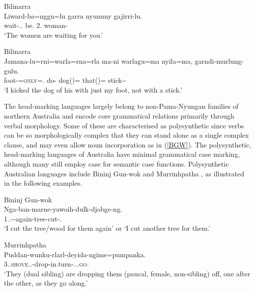 \documentclass[output=paper,hidelinks]{langscibook}
\begin{document}
%
\ea Bilinarra\\
\gll Liward-ba=nggu=lu garra nyununy gajirri-lu.\\
{wait-\MIN.\AUG.\SBJ} 	{be.\PRS} {2\MIN.\DAT} {woman-\ERG}\\
\glt `The women are waiting for you.’ \citep[121]{MeakNord14}
\z

\ea Bilinarra\\
\gll Jamana-lu=rni=warla=rna=rla ma-ni warlagu=ma nyila=ma, garndi-murlung-gulu.\\ 	
 {foot-\ERG={\textsc{only}}=\MIN.\OBL}	 {do-\PST}	 {dog(\ACC)=\TOP} {that(\ACC)=\TOP} {stick-\PRIV-\ERG}\\
\glt `I kicked the dog of his with just my foot, not with a stick.' \citep[121]{MeakNord14}
\z

\begin{sloppypar}
The head-marking languages largely belong to non-Pama-Nyungan families of northern Australia and encode core grammatical relations primarily through verbal morphology. Some of these are characterised as polysynthetic since verbs can be so morphologically complex that they can stand alone as a single complex clause, and may even allow noun incorporation as in (\ref{BGW}). The polysynthetic, head-marking languages of Australia have minimal grammatical case marking, although many still employ case for semantic case functions. Polysynthetic Australian languages include Bininj Gun-wok \citep{Evans2003} and Murrinhpatha \citep{Blythe2009,Nordlinger2017,Mansfield2019}, as illustrated in the following examples. 
\end{sloppypar}

\ea \label{BGW} Bininj Gun-wok\\
\gll Nga-ban-marne-yawoih-dulk-djobge-ng.\\
	{1\SG.\PL.\OBJ-\BEN-again-tree-cut-\PST.\PFV}\\
\glt	`I cut the tree/wood for them again' or ‘I cut another tree for them.’ \citep[2]{EvanSass2002}
\z

\ea Murrinhpatha\\
\gll Puddan-wunku-rlarl-deyida-ngime=pumpanka.\\ 
 {3\DU.\SBJ.\textsc{shove}.\DU.\OBJ-drop-in.turn-\PC.\DU.\SBJ.\textsc{go}.\NFUT}\\ 
\glt	`They (dual sibling) are dropping them (paucal, female, non-sibling) off, one after the other, as they go along.’ \citep[134]{Blythe2009}
\z
\end{document}
